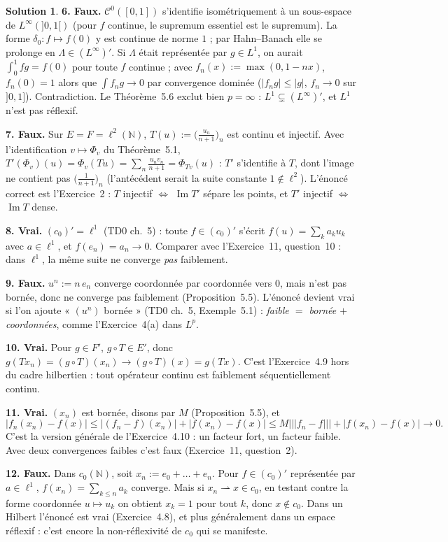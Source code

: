 \documentclass[11pt,a4paper]{article}
\newcommand{\N}{\mathbb{N}}
\newcommand{\opnorm}[1]{|\!|\!|#1|\!|\!|}
\newcommand{\Cz}{\mathcal{C}^0}
\newcommand{\wk}{\rightharpoonup}
\DeclareMathOperator{\Ima}{Im}
\theoremstyle{definition}
\newtheorem*{solution}{Solution}
\begin{document}
\begin{solution}
\medskip
\noindent\textbf{6. Faux.} $\Cz([0,1])$ s'identifie isométriquement à un sous-espace de $L^\infty(]0,1[)$ (pour $f$ continue, le supremum essentiel est le supremum). La forme $\delta_0:f\mapsto f(0)$ y est continue de norme $1$ ; par Hahn--Banach elle se prolonge en $\Lambda\in(L^\infty)'$. Si $\Lambda$ était représentée par $g\in L^1$, on aurait $\int_0^1fg=f(0)$ pour toute $f$ continue ; avec $f_n(x):=\max(0,1-nx)$, $f_n(0)=1$ alors que $\int f_ng\to0$ par convergence dominée ($|f_ng|\le|g|$, $f_n\to0$ sur $]0,1]$). Contradiction. Le Théorème~5.6 exclut bien $p=\infty$ : $L^1\subsetneq(L^\infty)'$, et $L^1$ n'est pas réflexif.

\medskip
\noindent\textbf{7. Faux.} Sur $E=F=\ell^2(\N)$, $T(u):=\big(\frac{u_n}{n+1}\big)_n$ est continu et injectif. Avec l'identification $v\mapsto\Phi_v$ du Théorème~5.1, $T'(\Phi_v)(u)=\Phi_v(Tu)=\sum_n\frac{u_nv_n}{n+1}=\Phi_{Tv}(u)$ : $T'$ s'identifie à $T$, dont l'image ne contient pas $\big(\frac1{n+1}\big)_n$ (l'antécédent serait la suite constante $1\notin\ell^2$). L'énoncé correct est l'Exercice~2 : $T$ injectif $\iff$ $\Ima T'$ sépare les points, et $T'$ injectif $\iff$ $\Ima T$ dense.

\medskip
\noindent\textbf{8. Vrai.} $(c_0)'=\ell^1$ (TD0 ch.~5) : toute $f\in(c_0)'$ s'écrit $f(u)=\sum_ka_ku_k$ avec $a\in\ell^1$, et $f(e_n)=a_n\to0$. Comparer avec l'Exercice~11, question~10 : dans $\ell^1$, la même suite ne converge \emph{pas} faiblement.

\medskip
\noindent\textbf{9. Faux.} $u^n:=n\,e_n$ converge coordonnée par coordonnée vers $0$, mais n'est pas bornée, donc ne converge pas faiblement (Proposition~5.5). L'énoncé devient vrai si l'on ajoute « $(u^n)$ bornée » (TD0 ch.~5, Exemple~5.1) : \emph{faible $=$ bornée $+$ coordonnées}, comme l'Exercice~4(a) dans $L^p$.

\medskip
\noindent\textbf{10. Vrai.} Pour $g\in F'$, $g\circ T\in E'$, donc $g(Tx_n)=(g\circ T)(x_n)\to(g\circ T)(x)=g(Tx)$. C'est l'Exercice~4.9 hors du cadre hilbertien : tout opérateur continu est faiblement séquentiellement continu.

\medskip
\noindent\textbf{11. Vrai.} $(x_n)$ est bornée, disons par $M$ (Proposition~5.5), et
\[
|f_n(x_n)-f(x)|\le|(f_n-f)(x_n)|+|f(x_n)-f(x)|\le M\opnorm{f_n-f}+|f(x_n)-f(x)|\to0 .
\]
C'est la version générale de l'Exercice~4.10 : un facteur fort, un facteur faible. Avec deux convergences faibles c'est faux (Exercice~11, question~2).

\medskip
\noindent\textbf{12. Faux.} Dans $c_0(\N)$, soit $x_n:=e_0+\dots+e_n$. Pour $f\in(c_0)'$ représentée par $a\in\ell^1$, $f(x_n)=\sum_{k\le n}a_k$ converge. Mais si $x_n\wk x\in c_0$, en testant contre la forme coordonnée $u\mapsto u_k$ on obtient $x_k=1$ pour tout $k$, donc $x\notin c_0$. Dans un Hilbert l'énoncé est vrai (Exercice~4.8), et plus généralement dans un espace réflexif : c'est encore la non-réflexivité de $c_0$ qui se manifeste.


\end{solution}
\end{document}
